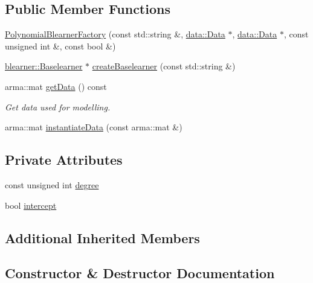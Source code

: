 \subsection*{Public Member Functions}
\begin{DoxyCompactItemize}
\item 
\hyperlink{classblearnerfactory_1_1_polynomial_blearner_factory_a4db6750e7534eb7731cc3d60350d91cf}{Polynomial\+Blearner\+Factory} (const std\+::string \&, \hyperlink{classdata_1_1_data}{data\+::\+Data} $\ast$, \hyperlink{classdata_1_1_data}{data\+::\+Data} $\ast$, const unsigned int \&, const bool \&)
\item 
\hyperlink{classblearner_1_1_baselearner}{blearner\+::\+Baselearner} $\ast$ \hyperlink{classblearnerfactory_1_1_polynomial_blearner_factory_ac0c7f742da0a2de444e91a0cfb0a9384}{create\+Baselearner} (const std\+::string \&)
\item 
arma\+::mat \hyperlink{classblearnerfactory_1_1_polynomial_blearner_factory_addce36fbb590b2cd3d9325b53ae74566}{get\+Data} () const
\begin{DoxyCompactList}\small\item\em Get data used for modelling. \end{DoxyCompactList}\item 
arma\+::mat \hyperlink{classblearnerfactory_1_1_polynomial_blearner_factory_aeea9c480671ae7cf7d3be470ce0feaef}{instantiate\+Data} (const arma\+::mat \&)
\end{DoxyCompactItemize}
\subsection*{Private Attributes}
\begin{DoxyCompactItemize}
\item 
const unsigned int \hyperlink{classblearnerfactory_1_1_polynomial_blearner_factory_a78c1852e3f1e1b43e6d8bef40032e19f}{degree}
\item 
bool \hyperlink{classblearnerfactory_1_1_polynomial_blearner_factory_a3a358bd08863c8f01fe20c8d55393df7}{intercept}
\end{DoxyCompactItemize}
\subsection*{Additional Inherited Members}


\subsection{Constructor \& Destructor Documentation}
\mbox{\label{classblearnerfactory_1_1_polynomial_blearner_factory_a4db6750e7534eb7731cc3d60350d91cf}} 
